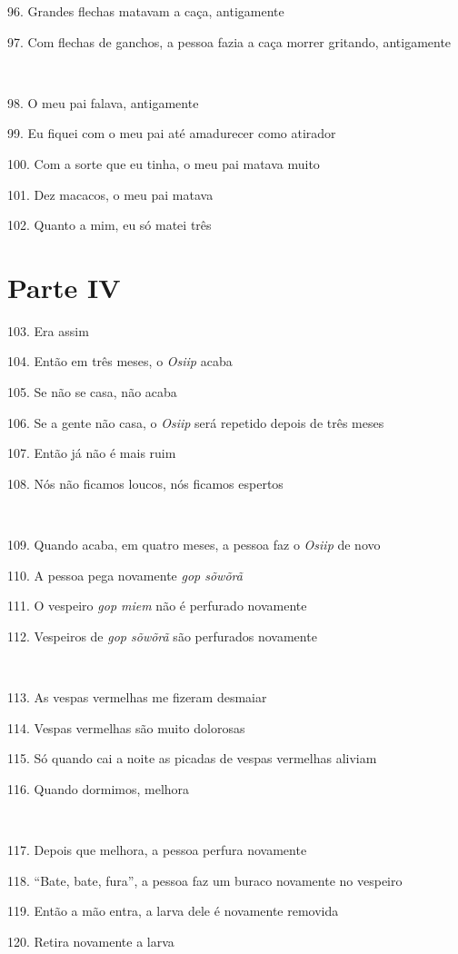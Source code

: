 96. Grandes flechas matavam a caça, antigamente

97. Com flechas de ganchos, a pessoa fazia a caça morrer gritando, antigamente

~

98. O meu pai falava, antigamente

99. Eu fiquei com o meu pai até amadurecer como atirador

100. Com a sorte que eu tinha, o meu pai matava muito

101. Dez macacos, o meu pai matava

102. Quanto a mim, eu só matei três

\section{Parte IV}

103. Era assim

104. Então em três meses, o \emph{Osiip} acaba

105. Se não se casa, não acaba

106. Se a gente não casa, o \emph{Osiip} será repetido depois de três meses

107. Então já não é mais ruim

108. Nós não ficamos loucos, nós ficamos espertos

~

109. Quando acaba, em quatro meses, a pessoa faz o \emph{Osiip} de novo

110. A pessoa pega novamente \emph{gop sõwõrã}

111. O vespeiro \emph{gop miem} não é perfurado novamente

112. Vespeiros de \emph{gop sõwõrã} são perfurados novamente

~

113. As vespas vermelhas me fizeram desmaiar

114. Vespas vermelhas são muito dolorosas

115. Só quando cai a noite as picadas de vespas vermelhas aliviam

116. Quando dormimos, melhora

~

117. Depois que melhora, a pessoa perfura novamente

118. ``Bate, bate, fura'', a pessoa faz um buraco novamente no vespeiro

119. Então a mão entra, a larva dele é novamente removida

120. Retira novamente a larva


